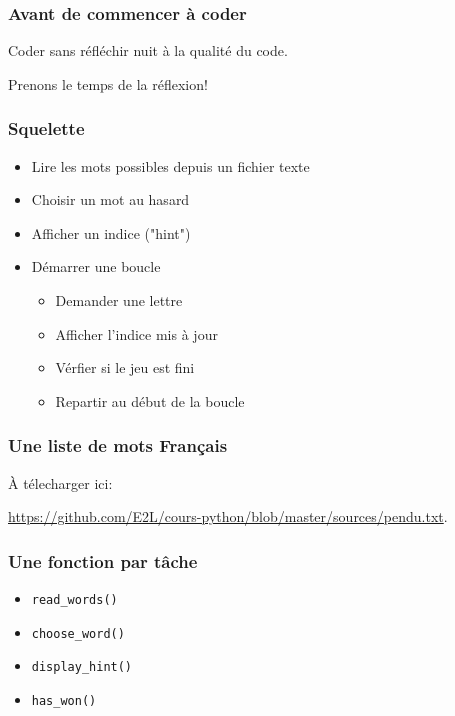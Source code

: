 \documentclass{beamer}
\begin{document}
\begin{frame}[fragile]
  \frametitle{Avant de commencer à coder}

Coder sans réfléchir nuit à la qualité du code.

\vfill

Prenons le temps de la réflexion!
\end{frame}


\begin{frame}[fragile]
  \frametitle{Squelette}

\begin{itemize}
  \item Lire les mots possibles depuis un fichier texte
  \item Choisir un mot au hasard
  \item Afficher un indice ("hint")
  \item Démarrer une boucle
    \begin{itemize}
      \item Demander une lettre
      \item Afficher l'indice mis à jour
      \item Vérfier si le jeu est fini
      \item Repartir au début de la boucle
    \end{itemize}
\end{itemize}

\end{frame}

\begin{frame}[fragile]
  \frametitle{Une liste de mots Français}

À télecharger ici:

\url{https://github.com/E2L/cours-python/blob/master/sources/pendu.txt}.

\end{frame}



\begin{frame}[fragile]
  \frametitle{Une fonction par tâche}

\begin{itemize}
  \item \texttt{read\_words()}
  \item \texttt{choose\_word()}
  \item \texttt{display\_hint()}
  \item \texttt{has\_won()}
\end{itemize}

\end{frame}
\end{document}
